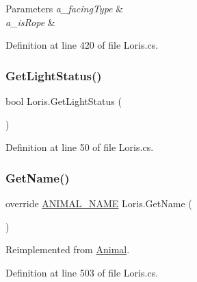 \begin{DoxyParams}{Parameters}
{\em a\+\_\+facing\+Type} & \\
\hline
{\em a\+\_\+is\+Rope} & \\
\hline
\end{DoxyParams}


Definition at line 420 of file Loris.\+cs.

\mbox{\label{class_loris_af59a730da01aa24a64c53e17f1882493}} 
\subsubsection{\texorpdfstring{Get\+Light\+Status()}{GetLightStatus()}}
{\footnotesize\ttfamily bool Loris.\+Get\+Light\+Status (\begin{DoxyParamCaption}{ }\end{DoxyParamCaption})}



Definition at line 50 of file Loris.\+cs.

\mbox{\label{class_loris_afb060974c2d879a9700544f12d0bc819}} 
\subsubsection{\texorpdfstring{Get\+Name()}{GetName()}}
{\footnotesize\ttfamily override \mbox{\hyperlink{_animal_8cs_a2fa5713399b84d1b88dae9196837af50}{A\+N\+I\+M\+A\+L\+\_\+\+N\+A\+ME}} Loris.\+Get\+Name (\begin{DoxyParamCaption}{ }\end{DoxyParamCaption})\hspace{0.3cm}{\ttfamily [virtual]}}



Reimplemented from \mbox{\hyperlink{class_animal_ab66ea3e3cb15a2b236ba9ba4d589ca69}{Animal}}.



Definition at line 503 of file Loris.\+cs.

\mbox{\label{class_loris_a502badf5cc594eb1f1f2dd1068c09ecd}} 
